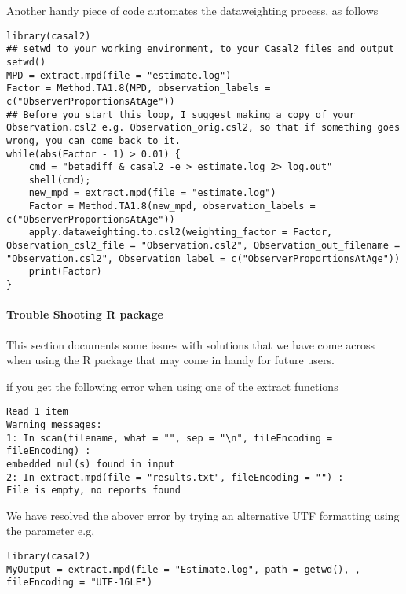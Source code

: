 Another handy piece of code automates the dataweighting process, as follows

\begin{lstlisting}
library(casal2)
## setwd to your working environment, to your Casal2 files and output
setwd()
MPD = extract.mpd(file = "estimate.log")
Factor = Method.TA1.8(MPD, observation_labels = c("ObserverProportionsAtAge"))
## Before you start this loop, I suggest making a copy of your Observation.csl2 e.g. Observation_orig.csl2, so that if something goes wrong, you can come back to it.
while(abs(Factor - 1) > 0.01) {
	cmd = "betadiff & casal2 -e > estimate.log 2> log.out"
	shell(cmd);
	new_mpd = extract.mpd(file = "estimate.log")
	Factor = Method.TA1.8(new_mpd, observation_labels = c("ObserverProportionsAtAge"))
	apply.dataweighting.to.csl2(weighting_factor = Factor, Observation_csl2_file = "Observation.csl2", Observation_out_filename = "Observation.csl2", Observation_label = c("ObserverProportionsAtAge"))
	print(Factor)
}
\end{lstlisting}
\paragraph*{Trouble Shooting R package}
This section documents some issues with solutions that we have come across when using the R package that may come in handy for future users.

if you get the following error when using one of the extract functions
\begin{lstlisting}
Read 1 item
Warning messages:
1: In scan(filename, what = "", sep = "\n", fileEncoding = fileEncoding) :
embedded nul(s) found in input
2: In extract.mpd(file = "results.txt", fileEncoding = "") :
File is empty, no reports found
\end{lstlisting}

We have resolved the abover error by trying an alternative UTF formatting using the  parameter e.g,
\begin{lstlisting}
library(casal2)
MyOutput = extract.mpd(file = "Estimate.log", path = getwd(), , fileEncoding = "UTF-16LE")
\end{lstlisting}
